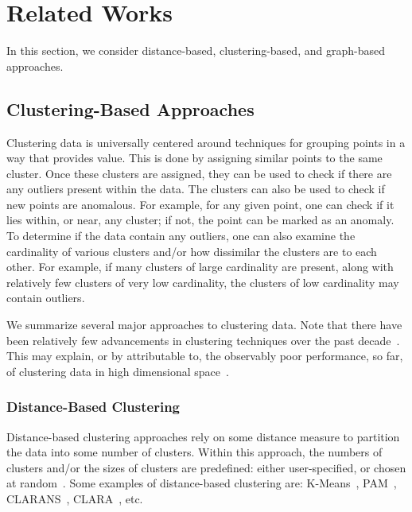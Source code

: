 \section{Related Works}
\label{sec:related_works}

In this section, we consider distance-based, clustering-based, and graph-based approaches.

\subsection{Clustering-Based Approaches}

Clustering data is universally centered around techniques for grouping points in a way that provides value.
This is done by assigning similar points to the same cluster.
Once these clusters are assigned, they can be used to check if there are any outliers present within the data.
The clusters can also be used to check if new points are anomalous.
For example, for any given point, one can check if it lies within, or near, any cluster; if not, the point can be marked as an anomaly.
To determine if the data contain any outliers, one can also examine the cardinality of various clusters and/or how dissimilar the clusters are to each other.
For example, if many clusters of large cardinality are present, along with relatively few clusters of very low cardinality, the clusters of low cardinality may contain outliers.

We summarize several major approaches to clustering data.
Note that there have been relatively few advancements in clustering techniques over the past decade~\cite{wang_progress_2019}. This may explain, or by attributable to, the observably poor performance, so far, of clustering data in high dimensional space~\cite{zhang_advancements_2013}.

\subsubsection{Distance-Based Clustering}

Distance-based clustering approaches rely on some distance measure to partition the data into some number of clusters.
Within this approach, the numbers of clusters and/or the sizes of clusters are predefined: either user-specified, or chosen at random~\cite{wang_progress_2019}.
Some examples of distance-based clustering are: 
K-Means~\cite{macqueen_methods_nodate}, 
PAM~\cite{kaufman_finding_nodate}, 
CLARANS~\cite{ng_efficient_nodate}, 
CLARA~\cite{kaufman_finding_nodate}, 
etc.

